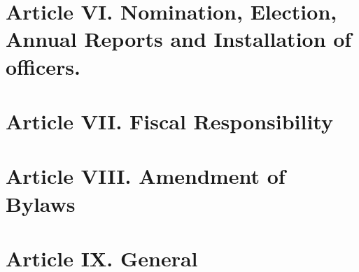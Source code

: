 \documentclass[letterpaper,10pt]{article}
\begin{document}
\section*{Article VI. Nomination, Election, Annual Reports and Installation of officers.}

\section*{Article VII. Fiscal Responsibility}

\section*{Article VIII. Amendment of Bylaws}

\section*{Article IX. General}
\end{document}
